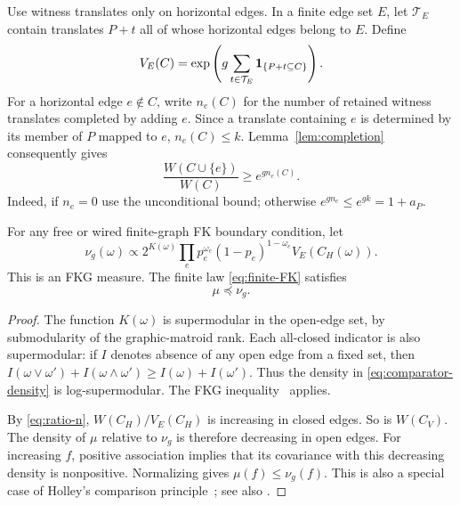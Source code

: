 Use witness translates only on horizontal edges. In a finite edge set \(E\), let \(\mathcal T_E\) contain translates \(P+t\) all of whose horizontal edges belong to \(E\). Define
\begin{equation}
 V_E(C)=\exp\left(g\sum_{t\in\mathcal T_E}
       \mathbf 1_{\{P+t\subseteq C\}}\right).
 \label{eq:V}
\end{equation}
For a horizontal edge \(e\notin C\), write \(n_e(C)\) for the number of retained witness translates completed by adding \(e\). Since a translate containing \(e\) is determined by its member of \(P\) mapped to \(e\),
\(n_e(C)\le k\). Lemma~\ref{lem:completion} consequently gives
\begin{equation}
 \frac{W(C\cup\{e\})}{W(C)}
 \ge e^{g n_e(C)}.
 \label{eq:ratio-n}
\end{equation}
Indeed, if \(n_e=0\) use the unconditional bound; otherwise
\(e^{g n_e}\le e^{gk}=1+a_P\).

\begin{lemma}\label{lem:comparator}
For any free or wired finite-graph FK boundary condition, let
\begin{equation}
 \nu_g(\omega)\propto
 2^{K(\omega)}\prod_e p_e^{\omega_e}(1-p_e)^{1-\omega_e}
 V_E(C_H(\omega)).
 \label{eq:comparator-density}
\end{equation}
This is an FKG measure. The finite law \eqref{eq:finite-FK} satisfies
\begin{equation}
 \mu\preceq\nu_g.
 \label{eq:holley}
\end{equation}
\end{lemma}
\begin{proof}
The function \(K(\omega)\) is supermodular in the open-edge set, by submodularity of the graphic-matroid rank. Each all-closed indicator is also supermodular: if \(I\) denotes absence of any open edge from a fixed set, then
\(I(\omega\vee\omega')+I(\omega\wedge\omega')
\ge I(\omega)+I(\omega')\).
Thus the density in \eqref{eq:comparator-density} is log-supermodular. The FKG inequality~\cite[Proposition 1]{FKG} applies.

By \eqref{eq:ratio-n}, \(W(C_H)/V_E(C_H)\) is increasing in closed edges. So is \(W(C_V)\). The density of \(\mu\) relative to \(\nu_g\) is therefore decreasing in open edges. For increasing \(f\), positive association implies that its covariance with this decreasing density is nonpositive. Normalizing gives \(\mu(f)\le\nu_g(f)\). This is also a special case of Holley's comparison principle~\cite[Theorem (6)]{Holley}; see also \cite[Theorems 2.19 and 2.27]{Grimmett}.
\end{proof}


